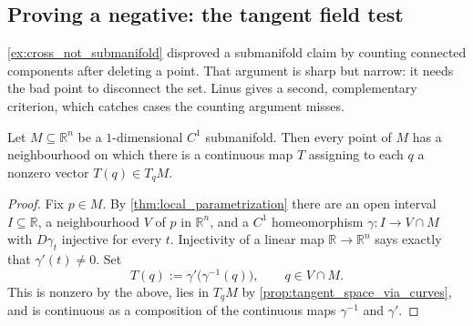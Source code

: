 \begin{center}
\end{center}

\subsection{Proving a negative: the tangent field test}

\cref{ex:cross_not_submanifold} disproved a submanifold claim by counting connected components
after deleting a point. That argument is sharp but narrow: it needs the bad point to disconnect
the set. Linus gives a second, complementary criterion, which catches cases the counting argument
misses.

\begin{proposition}
\label{prop:continuous_tangent_field}
Let $M \subseteq \mathbb{R}^n$ be a $1$-dimensional $C^1$ submanifold. Then every point of $M$
has a neighbourhood on which there is a continuous map $T$ assigning to each $q$ a nonzero vector
$T(q) \in T_qM$.
\end{proposition}

\begin{proof}
Fix $p \in M$. By \cref{thm:local_parametrization} there are an open interval $I \subseteq
\mathbb{R}$, a neighbourhood $V$ of $p$ in $\mathbb{R}^n$, and a $C^1$ homeomorphism
$\gamma : I \to V \cap M$ with $D\gamma_t$ injective for every $t$. Injectivity of a linear map
$\mathbb{R} \to \mathbb{R}^n$ says exactly that $\gamma'(t) \neq 0$. Set
\[T(q) := \gamma'\big(\gamma^{-1}(q)\big), \qquad q \in V \cap M.\]
This is nonzero by the above, lies in $T_qM$ by \cref{prop:tangent_space_via_curves}, and is
continuous as a composition of the continuous maps $\gamma^{-1}$ and $\gamma'$.
\end{proof}

